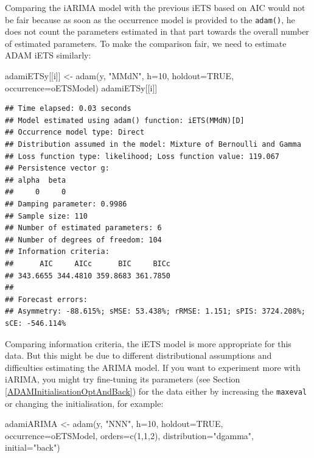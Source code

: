 \documentclass[
]{book}
\newenvironment{Shaded}{\begin{snugshade}}{\end{snugshade}}
\newcommand{\AttributeTok}[1]{\textcolor[rgb]{0.77,0.63,0.00}{#1}}
\newcommand{\ConstantTok}[1]{\textcolor[rgb]{0.00,0.00,0.00}{#1}}
\newcommand{\DecValTok}[1]{\textcolor[rgb]{0.00,0.00,0.81}{#1}}
\newcommand{\FunctionTok}[1]{\textcolor[rgb]{0.00,0.00,0.00}{#1}}
\newcommand{\NormalTok}[1]{#1}
\newcommand{\OtherTok}[1]{\textcolor[rgb]{0.56,0.35,0.01}{#1}}
\newcommand{\StringTok}[1]{\textcolor[rgb]{0.31,0.60,0.02}{#1}}
\theoremstyle{definition}
\theoremstyle{definition}
\theoremstyle{definition}
\theoremstyle{definition}
\theoremstyle{remark}
\begin{document}
Comparing the iARIMA model with the previous iETS based on AIC would not be fair because as soon as the occurrence model is provided to the \texttt{adam()}, he does not count the parameters estimated in that part towards the overall number of estimated parameters. To make the comparison fair, we need to estimate ADAM iETS similarly:

\begin{Shaded}
\begin{Highlighting}[]
\NormalTok{adamiETSy[[i]] }\OtherTok{\textless{}{-}} \FunctionTok{adam}\NormalTok{(y, }\StringTok{"MMdN"}\NormalTok{, }\AttributeTok{h=}\DecValTok{10}\NormalTok{, }\AttributeTok{holdout=}\ConstantTok{TRUE}\NormalTok{,}
                       \AttributeTok{occurrence=}\NormalTok{oETSModel)}
\NormalTok{adamiETSy[[i]]}
\end{Highlighting}
\end{Shaded}

\begin{verbatim}
## Time elapsed: 0.03 seconds
## Model estimated using adam() function: iETS(MMdN)[D]
## Occurrence model type: Direct
## Distribution assumed in the model: Mixture of Bernoulli and Gamma
## Loss function type: likelihood; Loss function value: 119.067
## Persistence vector g:
## alpha  beta 
##     0     0 
## Damping parameter: 0.9986
## Sample size: 110
## Number of estimated parameters: 6
## Number of degrees of freedom: 104
## Information criteria:
##      AIC     AICc      BIC     BICc 
## 343.6655 344.4810 359.8683 361.7850 
## 
## Forecast errors:
## Asymmetry: -88.615%; sMSE: 53.438%; rRMSE: 1.151; sPIS: 3724.208%; sCE: -546.114%
\end{verbatim}

Comparing information criteria, the iETS model is more appropriate for this data. But this might be due to different distributional assumptions and difficulties estimating the ARIMA model. If you want to experiment more with iARIMA, you might try fine-tuning its parameters (see Section \ref{ADAMInitialisationOptAndBack}) for the data either by increasing the \texttt{maxeval} or changing the initialisation, for example:

\begin{Shaded}
\begin{Highlighting}[]
\NormalTok{adamiARIMA }\OtherTok{\textless{}{-}} \FunctionTok{adam}\NormalTok{(y, }\StringTok{"NNN"}\NormalTok{, }\AttributeTok{h=}\DecValTok{10}\NormalTok{, }\AttributeTok{holdout=}\ConstantTok{TRUE}\NormalTok{,}
                   \AttributeTok{occurrence=}\NormalTok{oETSModel, }\AttributeTok{orders=}\FunctionTok{c}\NormalTok{(}\DecValTok{1}\NormalTok{,}\DecValTok{1}\NormalTok{,}\DecValTok{2}\NormalTok{),}
                   \AttributeTok{distribution=}\StringTok{"dgamma"}\NormalTok{, }\AttributeTok{initial=}\StringTok{"back"}\NormalTok{)}
\end{Highlighting}
\end{Shaded}
\end{document}
